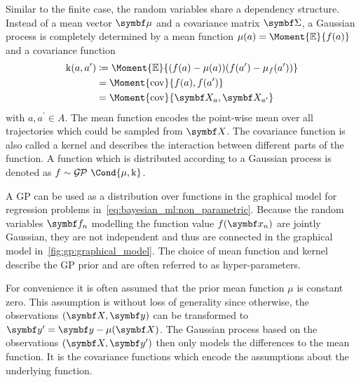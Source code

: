 Similar to the finite case, the random variables share a dependency structure.
Instead of a mean vector $\mat{\mu}$ and a covariance matrix $\mat{\Sigma}$, a Gaussian process is completely determined by a mean function $\mu(a) = \Moment{\E}{f(a)}$ and a covariance function
\begin{align}
    \begin{split}
        \K(a, a^\prime) &\coloneqq \Moment{\E}{(f(a) - \mu(a))(f(a^\prime) - \mu_f(a^\prime))} \\
        &= \Moment{\cov}{f(a), f(a^\prime)} \\
        &= \Moment{\cov}{\rv{X}_a, \rv{X}_{a^\prime}}
    \end{split}
\end{align}
with $a, a^\prime \in A$.
The mean function encodes the point-wise mean over all trajectories which could be sampled from $\rv{X}$.
The covariance function is also called a kernel and describes the interaction between different parts of the function.
A function which is distributed according to a Gaussian process is denoted as $f \sim \GP\Cond{\mu, \K}$.

A GP can be used as a distribution over functions in the graphical model for regression problems in~\cref{eq:bayesian_ml:non_parametric}.
Because the random variables $\mat{f}_n$ modelling the function value $f(\mat{x}_n)$ are jointly Gaussian, they are not independent and thus are connected in the graphical model in~\cref{fig:gp:graphical_model}.
The choice of mean function
and kernel
describe the GP prior and are often referred to as hyper-parameters.

For convenience it is often assumed that the prior mean function $\mu$ is constant zero.
This assumption is without loss of generality \cite{rasmussen_gaussian_2006} since otherwise, the observations $\left( \mat{X}, \mat{y} \right)$ can be transformed to $\mat{y^\prime} = \mat{y} - \mu(\mat{X})$.
The Gaussian process based on the observations $\left( \mat{X}, \mat{y^\prime} \right)$ then only models the differences to the mean function.
It is the covariance functions which encode the assumptions about the underlying function.

